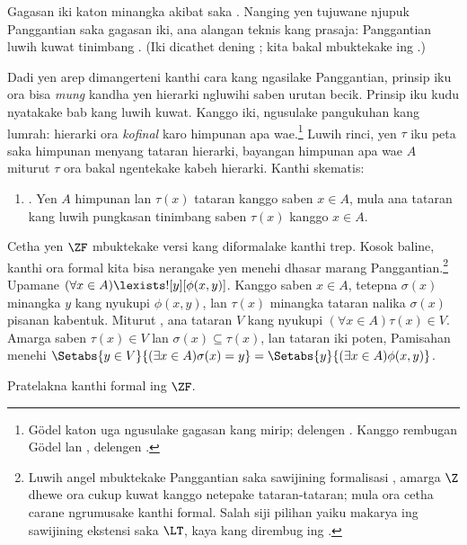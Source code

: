 \documentclass[../../../include/open-logic-section]{subfiles}
\begin{document}
Gagasan iki katon minangka akibat saka
\stagesinex. Nanging yen tujuwane njupuk
Panggantian saka gagasan iki, ana alangan
teknis kang prasaja: Panggantian luwih kuwat
tinimbang
.
(Iki dicathet dening \citet[\S13.2]{Potter2004};
kita bakal mbuktekake ing
.)

Dadi yen \stagesinex{} arep dimangerteni
kanthi cara kang ngasilake Panggantian,
prinsip iku ora bisa \emph{mung} kandha yen
hierarki ngluwihi saben urutan becik. Prinsip
iku kudu nyatakake bab kang luwih kuwat.
Kanggo iki, \cite{Shoenfield:AST} ngusulake
pangukuhan kang lumrah: hierarki ora
\emph{kofinal} karo himpunan apa wae.\footnote{G\"odel
katon uga ngusulake gagasan kang mirip; delengen
\citet[p.~223]{Potter2004}. Kanggo rembugan
G\"odel lan \citeauthor{Shoenfield:AST},
delengen \citet[90--5]{Incurvati2020}.}
Luwih rinci, yen $\tau$ iku peta saka
himpunan menyang tataran hierarki, bayangan
himpunan apa wae $A$ miturut $\tau$ ora bakal
ngentekake kabeh hierarki. Kanthi skematis:
\begin{enumerate}
	\item[] \stagescofin. Yen $A$ himpunan lan
	$\tau(x)$ tataran kanggo saben $x \in A$,
	mula ana tataran kang luwih pungkasan
	tinimbang saben $\tau(x)$ kanggo $x \in A$.
\end{enumerate}
Cetha yen $\ZF$ mbuktekake versi
\stagescofin{} kang diformalake kanthi trep.
Kosok baline, kanthi ora formal kita bisa
nerangake yen \stagescofin{} menehi dhasar
marang Panggantian.\footnote{Luwih angel
mbuktekake Panggantian saka sawijining
formalisasi \stagescofin, amarga $\Z$ dhewe
ora cukup kuwat kanggo netepake tataran-tataran;
mula ora cetha carane ngrumusake
\stagescofin kanthi formal. Salah siji pilihan
yaiku makarya
ing sawijining ekstensi saka $\LT$, kaya kang
dirembug ing
.}
Upamane $(\forall x \in A)\lexists![y][\phi(x,y)]$.
Kanggo saben $x \in A$, tetepna $\sigma(x)$
minangka $y$ kang nyukupi $\phi(x,y)$, lan
$\tau(x)$ minangka tataran nalika $\sigma(x)$
pisanan kabentuk. Miturut \stagescofin, ana
tataran $V$ kang nyukupi
$(\forall x \in A)\tau(x)\in V$. Amarga saben
$\tau(x) \in V$ lan $\sigma(x) \subseteq \tau(x)$,
lan tataran iki poten, Pamisahan menehi
$\Setabs{y \in V}{(\exists x \in A)\sigma(x) = y}
= \Setabs{y}{(\exists x \in A)\phi(x,y)}$.

\begin{prob}
	Pratelakna \stagescofin{} kanthi formal ing $\ZF$.
\end{prob}
\end{document}
